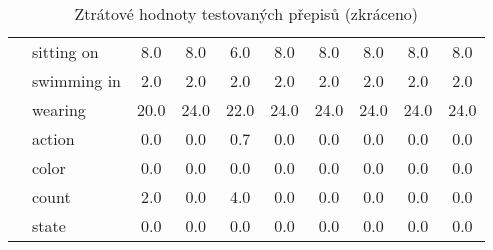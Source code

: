 \begin{table}[ht!]
\begin{tabular}{|c|l|c|c|c|c|c|c|c|c|}
		                                                                  & {sitting on}                                & 8.0        & 8.0        & 6.0        & 8.0        & 8.0         & 8.0         & 8.0         & 8.0   \\
		                                                                  & {swimming in}                               & 2.0        & 2.0        & 2.0        & 2.0        & 2.0         & 2.0         & 2.0         & 2.0   \\
		                                                                  & {wearing}                                   & 20.0       & 24.0       & 22.0       & 24.0       & 24.0        & 24.0        & 24.0        & 24.0  \\
		\hline
		\multirow{4}{*}{\rotatebox[origin=c]{90}{chybné atr.}}            & {action}                                    & 0.0        & 0.0        & 0.7        & 0.0        & 0.0         & 0.0         & 0.0         & 0.0   \\
		                                                                  & {color}                                     & 0.0        & 0.0        & 0.0        & 0.0        & 0.0         & 0.0         & 0.0         & 0.0   \\
		                                                                  & {count}                                     & 2.0        & 0.0        & 4.0        & 0.0        & 0.0         & 0.0         & 0.0         & 0.0   \\
		                                                                  & {state}                                     & 0.0        & 0.0        & 0.0        & 0.0        & 0.0         & 0.0         & 0.0         & 0.0   \\
		\hline
	\end{tabular}
	\caption{Ztrátové hodnoty testovaných přepisů (zkráceno)}\label{tab:out_values}
\end{table}
